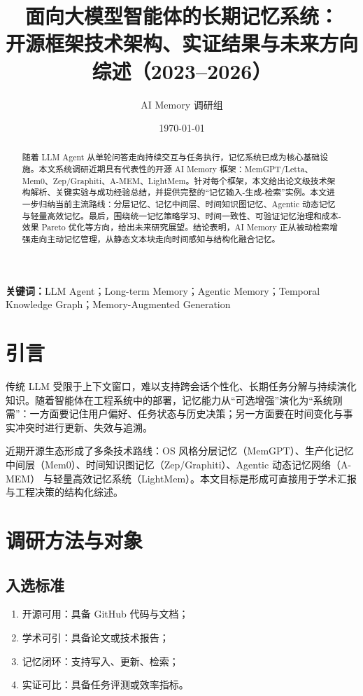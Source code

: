 \documentclass[12pt,a4paper]{article}
\title{面向大模型智能体的长期记忆系统：\\
开源框架技术架构、实证结果与未来方向综述（2023--2026）}
\author{AI Memory 调研组}
\date{\today}
\begin{document}
\maketitle

\begin{abstract}
随着 LLM Agent 从单轮问答走向持续交互与任务执行，记忆系统已成为核心基础设施。本文系统调研近期具有代表性的开源 AI Memory 框架：MemGPT/Letta、Mem0、Zep/Graphiti、A-MEM、LightMem。针对每个框架，本文给出论文级技术架构解析、关键实验与成功经验总结，并提供完整的“记忆输入-生成-检索”实例。本文进一步归纳当前主流路线：分层记忆、记忆中间层、时间知识图记忆、Agentic 动态记忆与轻量高效记忆。最后，围绕统一记忆策略学习、时间一致性、可验证记忆治理和成本-效果 Pareto 优化等方向，给出未来研究展望。结论表明，AI Memory 正从被动检索增强走向主动记忆管理，从静态文本块走向时间感知与结构化融合记忆。
\end{abstract}

\noindent\textbf{关键词：}LLM Agent；Long-term Memory；Agentic Memory；Temporal Knowledge Graph；Memory-Augmented Generation

\section{引言}
传统 LLM 受限于上下文窗口，难以支持跨会话个性化、长期任务分解与持续演化知识。随着智能体在工程系统中的部署，记忆能力从“可选增强”演化为“系统刚需”：一方面要记住用户偏好、任务状态与历史决策；另一方面要在时间变化与事实冲突时进行更新、失效与追溯。

近期开源生态形成了多条技术路线：OS 风格分层记忆（MemGPT）\cite{memgpt2024}、生产化记忆中间层（Mem0）\cite{mem02025}、时间知识图记忆（Zep/Graphiti）\cite{zep2025,graphiti2024}、Agentic 动态记忆网络（A-MEM）\cite{amem2025} 与轻量高效记忆系统（LightMem）\cite{lightmem2025}。本文目标是形成可直接用于学术汇报与工程决策的结构化综述。

\section{调研方法与对象}
\subsection{入选标准}
\begin{enumerate}[leftmargin=2em]
  \item 开源可用：具备 GitHub 代码与文档；
  \item 学术可引：具备论文或技术报告；
  \item 记忆闭环：支持写入、更新、检索；
  \item 实证可比：具备任务评测或效率指标。
\end{enumerate}
\end{document}
